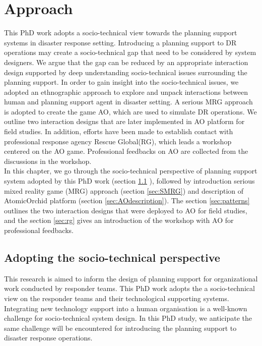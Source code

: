 \chapter{Approach}\label{ch:approach}
This PhD work adopts a socio-technical view towards the planning support systems in disaster response setting. Introducing a planning support to \acf{DR} operations may create a socio-technical gap that need to be considered by system designers. We argue that the gap can be reduced by an appropriate interaction design supported by deep understanding socio-technical issues surrounding the planning support. In order to gain insight into the socio-technical issues, we adopted an ethnographic approach to explore and unpack interactions between human and planning support agent in disaster setting. A serious \acf{MRG} approach is adopted to create the game \acf{AO}, which are used to simulate \ac{DR} operations. We outline two interaction designs that are later implemented in \ac{AO} platform for field studies. In addition, efforts have been made to establish contact with professional response agency Rescue Global(RG), which leads a workshop centered on the AO game. Professional feedbacks on AO are collected from the discussions in the workshop. \\

In this chapter, we go through the socio-technical perspective of planning support system adopted by this PhD work (section \ref{sec:sociotech} ), followed by introduction serious mixed reality game (MRG) approach (section \ref{sec:SMRG}) and description of AtomicOrchid platform (section \ref{sec:AOdescription}). The section \ref{sec:patterns} outlines the two interaction designs that were deployed to AO for field studies, and the section \ref{sec:rg} gives an introduction of the workshop with \ac{AO} for professional feedbacks. \\


\section{Adopting the socio-technical perspective}\label{sec:sociotech}
This research is aimed to inform the design of planning support for organizational work conducted by responder teams. This PhD work adopts the a socio-technical view on the responder teams and their technological supporting systems. Integrating new technology support into a human organisation is a well-known challenge for socio-technical system design. In this PhD study, we anticipate the same challenge will be encountered for introducing the planning support to disaster response operations.\\

